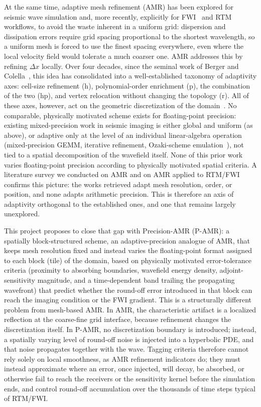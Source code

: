 \documentclass[12pt,a4paper]{article}
\newcommand{\pamr}{P\nobreakdash-AMR}
\begin{document}
At the same time, adaptive mesh refinement (AMR) has been explored for
seismic wave simulation and, more recently, explicitly for
FWI~\cite{thrastarson2020wavefield2,takekawa2016adaptive} and
RTM~\cite{yang2024elasticrtm,lu2024nested,cho2019frequency,liu2020topography}
workflows, to avoid the waste inherent in a uniform grid: dispersion and
dissipation errors require grid spacing proportional to the shortest
wavelength, so a uniform mesh is forced to use the finest spacing
everywhere, even where the local velocity field would tolerate a much
coarser one. AMR addresses this by refining $\Delta x$ locally. Over four
decades, since the seminal work of Berger and Colella~\cite{berger1989amr},
this idea has consolidated into a well-established taxonomy of adaptivity
axes: cell-size refinement (h), polynomial-order enrichment (p), the
combination of the two (hp), and vertex relocation without changing the
topology (r). All of these axes, however, act on the geometric
discretization of the domain~\cite{vivarelli2025review}. No comparable,
physically motivated scheme exists for floating-point precision: existing
mixed-precision work in seismic imaging is either global and uniform (as
above), or adaptive only at the level of an individual linear-algebra
operation (mixed-precision GEMM, iterative refinement, Ozaki-scheme
emulation~\cite{ozaki2012errorfree}), not tied to a spatial decomposition of
the wavefield itself. None of this prior work varies floating-point
precision according to physically motivated spatial criteria. A literature
survey we conducted on AMR and on AMR applied to RTM/FWI confirms this
picture: the works retrieved adapt mesh resolution, order, or position, and
none adapts arithmetic precision. This is therefore an axis of adaptivity
orthogonal to the established ones, and one that remains largely
unexplored.

This project proposes to close that gap with Precision-AMR (\pamr{}): a
spatially block-structured scheme, an adaptive-precision analogue of AMR,
that keeps mesh resolution fixed and instead varies the floating-point
format assigned to each block (tile) of the domain, based on physically
motivated error-tolerance criteria (proximity to absorbing boundaries,
wavefield energy density, adjoint-sensitivity magnitude, and a
time-dependent band trailing the propagating wavefront) that predict whether
the round-off error introduced in that block can reach the imaging
condition or the FWI gradient. This is a structurally different problem
from mesh-based AMR. In AMR, the characteristic artifact is a localized
reflection at the coarse-fine grid interface, because refinement changes
the discretization itself. In \pamr{}, no discretization boundary is
introduced; instead, a spatially varying level of round-off noise is
injected into a hyperbolic PDE, and that noise propagates together with the
wave. Tagging criteria therefore cannot rely solely on local smoothness, as
AMR refinement indicators do; they must instead approximate where an error,
once injected, will decay, be absorbed, or otherwise fail to reach the
receivers or the sensitivity kernel before the simulation ends, and control
round-off accumulation over the thousands of time steps typical of RTM/FWI.
\end{document}
